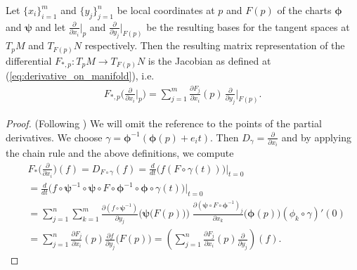 \documentclass[../master_thesis.tex]{subfiles}
\begin{document}
\begin{proposition}
    Let $\{x_i\}_{i=1}^m$ and $\{y_j\}_{j=1}^n$ be local coordinates at 
    $p$ and $F(p)$ of the charts $\bm{\phi}$ and $\bm{\psi}$ and let $\frac{\partial}{\partial x_i}|_p$ and 
    $\frac{\partial}{\partial y_j}|_{F(p)}$ be the resulting bases for the 
    tangent spaces at $T_p M$ and $T_{F(p)} N$ respectively. Then 
    the resulting matrix representation of the differential 
    $F_{*,p}:T_p M \rightarrow 
    T_{F(p)}N$ is the Jacobian as defined at (\ref{eq:derivative_on_manifold}), i.e.
    \begin{align*}
        F_{*,p} \bigg( \frac{\partial}{\partial x_i}\Big|_p \bigg)
        = \sum_{j=1}^m \frac{\partial F_j}{\partial x_i}(p)\,
            \frac{\partial}{\partial y_j}\Big|_{F(p)}. 
    \end{align*}
\end{proposition}
\begin{proof}
    (Following \cite[p.79]{topology_and_geometry})
    We will omit the reference to the points of the partial derivatives.
    We choose $\gamma = \boldsymbol{\phi}^{-1}(\boldsymbol{\phi}(p) + e_i t)$. Then 
    $D_\gamma = \frac{\partial}{\partial x_i}$ and by applying the chain 
    rule and the above definitions, we compute
    \begin{align*}
        &F_{*}\bigg(\frac{\partial}{\partial x_i}\bigg)(f)
        = D_{F\circ \gamma}(f)
        = \frac{d}{dt} \big(f(F \circ \gamma(t) ) \big)|_{t=0} 
        \\ &= \frac{d}{dt} \big(f \circ \boldsymbol{\psi}^{-1} \circ \boldsymbol{\psi}   
            \circ F \circ \boldsymbol{\phi}^{-1} \circ \boldsymbol{\phi} \circ \gamma(t)  \big)|_{t=0}
        \\ &= \sum_{j=1}^n \sum_{k=1}^m \frac{\partial (f \circ \boldsymbol{\psi}^{-1})}{\partial y_j}
            \Big(\boldsymbol{\psi}\big(F(p)\big)\Big) \; 
            \frac{\partial (\boldsymbol{\psi} \circ F \circ \boldsymbol{\phi}^{-1})_j}{\partial x_k}
            \big(\boldsymbol{\phi}(p)\big)  (\phi_k \circ \gamma)'(0)
        \\ &= \sum_{j=1}^n \frac{\partial F_j}{\partial x_i}(p) 
            \frac{\partial f}{\partial y_j}\big(F(p)\big)
        = \left( \sum_{j=1}^n \frac{\partial F_j}{\partial x_i}(p) 
            \frac{\partial}{\partial y_j} \right) (f).
    \end{align*} 
\end{proof}
\end{document}
